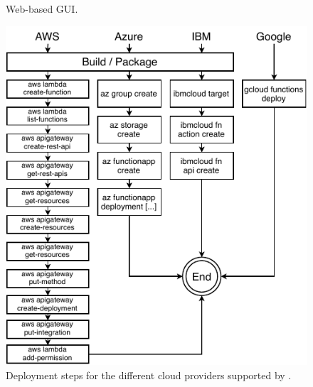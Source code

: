 \begin{figure}[!t]
\begin{center}
\fboxrule=0.25pt
\caption{\sys Web-based GUI.}
\label{fig:ui}
\end{center}
\end{figure}

\begin{figure}[!b]
\begin{center}
\includegraphics[scale=0.7]{bilder/deploy_flowcharts_small}
\caption{Deployment steps for the different cloud providers supported by \sys.}
\label{fig:flowchart}
\end{center}
\end{figure}

